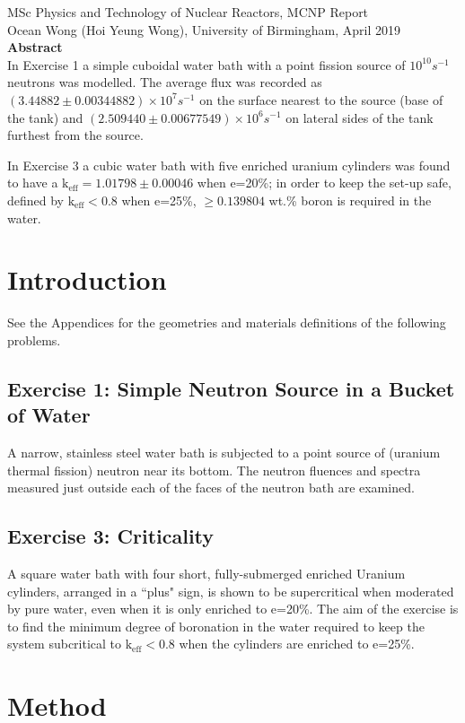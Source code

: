 \documentclass[a4paper, 11pt]{article}
\begin{document}
\begin{center}
MSc Physics and Technology of Nuclear Reactors,	MCNP Report\\
Ocean Wong (Hoi Yeung Wong), University of Birmingham,	April 2019		\\
\textbf{Abstract}								\\
In Exercise 1 a simple cuboidal water bath with a point fission source of $10^{10} s^{-1}$ neutrons was modelled. The average flux was recorded as $(3.44882\pm0.00344882) \times 10^{7} s^{-1}$ on the surface nearest to the source (base of the tank) and $(2.509440\pm0.00677549) \times 10^{6} s^{-1}$ on lateral sides of the tank furthest from the source.

In Exercise 3 a cubic water bath with five enriched uranium cylinders was found to have a $\text{k}_{\text{eff}} = 1.01798 \pm 0.00046$ when e=20\%; in order to keep the set-up safe, defined by $\text{k}_{\text{eff}} <0.8$ when e=25\%, $\ge 0.139804$ wt.\% boron is required in the water.
\end{center}
\section{Introduction}
See the Appendices for the geometries and materials definitions of the following problems.
\subsection{Exercise 1: Simple Neutron Source in a Bucket of Water}
A narrow, stainless steel water bath is subjected to a point source of (uranium thermal fission) neutron near its bottom. The neutron fluences and spectra measured just outside each of the faces of the neutron bath are examined. 
\subsection{Exercise 3: Criticality}
A square water bath with four short, fully-submerged enriched Uranium cylinders, arranged in a ``plus" sign, is shown to be supercritical when moderated by pure water, even when it is only enriched to e=20\%. The aim of the exercise is to find the minimum degree of boronation in the water required to keep the system subcritical to $\text{k}_{\text{eff}}<0.8$ when the cylinders are enriched to e=25\%.

\section{Method}
\end{document}
